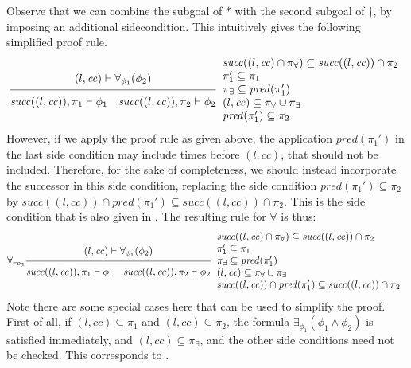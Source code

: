 \documentclass{article}
\newcommand{\proofrule}[3][]{#1 \frac{\raisebox{.7ex}{\normalsize{$#2$}}}
  {\raisebox{-1.0ex}{\normalsize{$#3$}}}}
\newcommand{\placeholder}[1][]{\pi_{#1}}
\newcommand{\loc}{l}
\newcommand{\region}{\mathit{cc}}
\newcommand{\suc}{\mathit{succ}}
\newcommand{\pre}{\mathit{pred}}
\begin{document}
Observe that we can combine the subgoal of $*$ with the second subgoal of $\dagger$, by imposing an additional sidecondition. This intuitively gives the following simplified proof rule.
\[
\proofrule
{(\loc, \region) \vdash \forall_{\phi_1}(\phi_2)}
{\suc((\loc, \region)), \placeholder[1] \vdash \phi_1
  \quad \suc((\loc, \region)), \placeholder[2] \vdash \phi_2
}
\begin{array}{l}
\suc((\loc, \region) \cap \placeholder[\forall]) \subseteq \suc((\loc, \region)) \cap \placeholder[2]\\
\placeholder[1]' \subseteq \placeholder[1]\\
\placeholder[\exists] \subseteq \pre(\placeholder[1]')\\
(\loc, \region) \subseteq \placeholder[\forall] \cup \placeholder[\exists]\\
\pre(\placeholder[1]') \subseteq \placeholder[2]
\end{array}
\]
However, if we apply the proof rule as given above, the application $\pre(\placeholder[1]')$ in 
the last side condition may include times before $(\loc, \region)$, that should not be included.
Therefore, for the sake of completeness, we should instead incorporate the successor in this
side condition, replacing the side condition $\pre(\placeholder[1]') \subseteq \placeholder[2]$ 
by $\suc((\loc, \region)) \cap \pre(\placeholder[1]') \subseteq \suc((\loc, \region)) \cap \placeholder[2]$.
This is the side condition that is also given in \cite[Appendix C.1]{FC:14report}.
The resulting rule for $\forall$ is thus:
\[
\proofrule[\forall_{ro_3}]
{(\loc, \region) \vdash \forall_{\phi_1}(\phi_2)}
{\suc((\loc, \region)), \placeholder[1] \vdash \phi_1
  \quad \suc((\loc, \region)), \placeholder[2] \vdash \phi_2
}
\begin{array}{l}
\suc((\loc, \region) \cap \placeholder[\forall]) \subseteq \suc((\loc, \region)) \cap \placeholder[2]\\
\placeholder[1]' \subseteq \placeholder[1]\\
\placeholder[\exists] \subseteq \pre(\placeholder[1]')\\
(\loc, \region) \subseteq \placeholder[\forall] \cup \placeholder[\exists]\\
\suc((\loc, \region)) \cap \pre(\placeholder[1]') \subseteq \suc((\loc, \region)) \cap \placeholder[2]
\end{array}
\]
Note there are some special cases here that can be used to simplify the proof. First of all,
if $(\loc, \region) \subseteq \placeholder[1]$ and $(\loc, \region) \subseteq \placeholder[2]$, the formula $\exists_{\phi_1}(\phi_1 \land \phi_2)$ is satisfied immediately, and $(\loc, \region) \subseteq \placeholder[\exists]$, and the other side conditions need not be checked. This corresponds to \cite[proof rule $\forall_{ro_2}$]{FC:14}.
\end{document}
